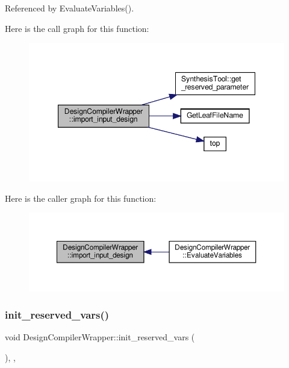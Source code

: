 Referenced by Evaluate\+Variables().

Here is the call graph for this function\+:
\nopagebreak
\begin{figure}[H]
\begin{center}
\leavevmode
\includegraphics[width=347pt]{d5/d55/classDesignCompilerWrapper_a216d4d77a0f799e699915650fdc58d5b_cgraph}
\end{center}
\end{figure}
Here is the caller graph for this function\+:
\nopagebreak
\begin{figure}[H]
\begin{center}
\leavevmode
\includegraphics[width=350pt]{d5/d55/classDesignCompilerWrapper_a216d4d77a0f799e699915650fdc58d5b_icgraph}
\end{center}
\end{figure}
\mbox{\label{classDesignCompilerWrapper_ac1adc09c852d3103b975cf53240b36ea}} 
\subsubsection{\texorpdfstring{init\+\_\+reserved\+\_\+vars()}{init\_reserved\_vars()}}
{\footnotesize\ttfamily void Design\+Compiler\+Wrapper\+::init\+\_\+reserved\+\_\+vars (\begin{DoxyParamCaption}{ }\end{DoxyParamCaption})\hspace{0.3cm}{\ttfamily [override]}, {\ttfamily [protected]}, {\ttfamily [virtual]}}



